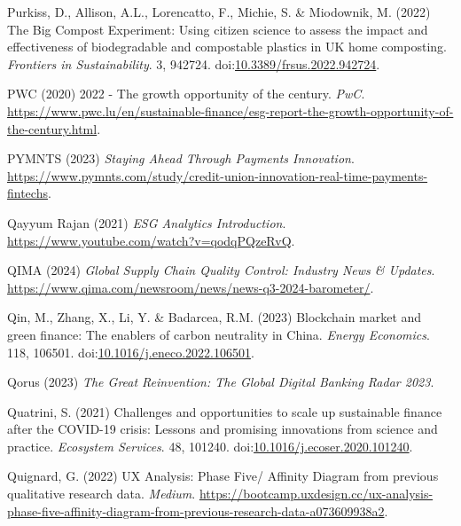 \documentclass[
  letterpaper,
  DIV=11,
  numbers=noendperiod]{scrartcl}
\newlength{\cslhangindent}
\newenvironment{CSLReferences}[2] %
 {\begin{list}{}{%
  \setlength{\itemindent}{0pt}
  \setlength{\leftmargin}{0pt}
  \setlength{\parsep}{0pt}
  \ifodd #1
   \setlength{\leftmargin}{\cslhangindent}
   \setlength{\itemindent}{-1\cslhangindent}
  \fi
  \setlength{\itemsep}{#2\baselineskip}}}
 {\end{list}}
\begin{document}
\begin{CSLReferences}{0}{1}
Purkiss, D., Allison, A.L., Lorencatto, F., Michie, S. \& Miodownik, M.
(2022) The {Big Compost Experiment}: {Using} citizen science to assess
the impact and effectiveness of biodegradable and compostable plastics
in {UK} home composting. \emph{Frontiers in Sustainability}. 3, 942724.
doi:\href{https://doi.org/10.3389/frsus.2022.942724}{10.3389/frsus.2022.942724}.

PWC (2020) {2022 - The growth opportunity of the century}. \emph{PwC}.
\url{https://www.pwc.lu/en/sustainable-finance/esg-report-the-growth-opportunity-of-the-century.html}.

PYMNTS (2023) \emph{Staying {Ahead Through Payments Innovation}}.
\url{https://www.pymnts.com/study/credit-union-innovation-real-time-payments-fintechs}.

Qayyum Rajan (2021) \emph{{ESG Analytics Introduction}}.
\url{https://www.youtube.com/watch?v=qodqPQzeRvQ}.

QIMA (2024) \emph{Global {Supply Chain Quality Control}: {Industry News}
\& {Updates}}.
\url{https://www.qima.com/newsroom/news/news-q3-2024-barometer/}.

Qin, M., Zhang, X., Li, Y. \& Badarcea, R.M. (2023) Blockchain market
and green finance: {The} enablers of carbon neutrality in {China}.
\emph{Energy Economics}. 118, 106501.
doi:\href{https://doi.org/10.1016/j.eneco.2022.106501}{10.1016/j.eneco.2022.106501}.

Qorus (2023) \emph{The {Great Reinvention}: {The Global Digital Banking
Radar} 2023}.

Quatrini, S. (2021) Challenges and opportunities to scale up sustainable
finance after the {COVID-19} crisis: {Lessons} and promising innovations
from science and practice. \emph{Ecosystem Services}. 48, 101240.
doi:\href{https://doi.org/10.1016/j.ecoser.2020.101240}{10.1016/j.ecoser.2020.101240}.

Quignard, G. (2022) {UX Analysis}: {Phase Five}/ {Affinity Diagram} from
previous qualitative research data. \emph{Medium}.
\url{https://bootcamp.uxdesign.cc/ux-analysis-phase-five-affinity-diagram-from-previous-research-data-a073609938a2}.


\end{CSLReferences}
\end{document}
